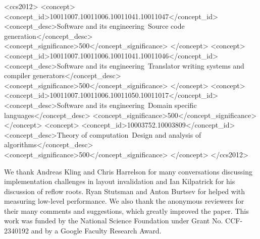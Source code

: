 \documentclass[acmsmall, screen]{acmart}
\begin{document}
%
%
\begin{CCSXML}
<ccs2012>
   <concept>
       <concept_id>10011007.10011006.10011041.10011047</concept_id>
       <concept_desc>Software and its engineering~Source code generation</concept_desc>
       <concept_significance>500</concept_significance>
       </concept>
   <concept>
       <concept_id>10011007.10011006.10011041.10011046</concept_id>
       <concept_desc>Software and its engineering~Translator writing systems and compiler generators</concept_desc>
       <concept_significance>500</concept_significance>
       </concept>
   <concept>
       <concept_id>10011007.10011006.10011050.10011017</concept_id>
       <concept_desc>Software and its engineering~Domain specific languages</concept_desc>
       <concept_significance>500</concept_significance>
       </concept>
   <concept>
       <concept_id>10003752.10003809</concept_id>
       <concept_desc>Theory of computation~Design and analysis of algorithms</concept_desc>
       <concept_significance>500</concept_significance>
       </concept>
 </ccs2012>
\end{CCSXML}

%
%



\maketitle

\renewcommand{\shortauthors}{Marisa Kirisame, Tiezhi Wang, and Pavel Panchekha}








\begin{acks}
We thank Andreas Kling and Chris Harrelson for many conversations
discussing implementation challenges in layout invalidation and Ian
Kilpatrick for his discussion of reflow roots. Ryan
Stutsman and Anton Burtsev for helped with measuring low-level performance.
We also thank the anonymous reviewers for their many comments and
suggestions, which greatly improved the paper. This work was funded by
the National Science Foundation under Grant No. CCF-2340192 and by a
Google Faculty Research Award.
\end{acks}
%


\end{document}
